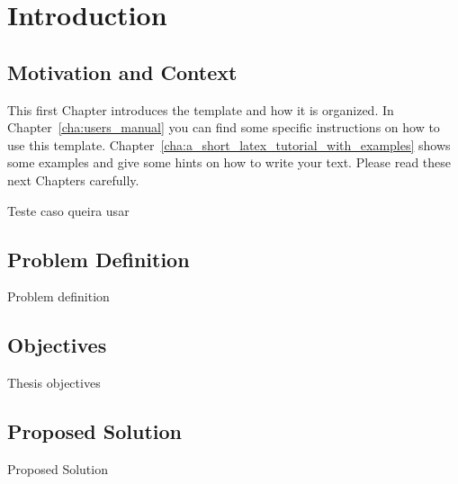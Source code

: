 
%

\chapter{Introduction}
\label{cha:introduction}




\section{Motivation and Context}
\label{sec:if_you_use_this_template}

This first Chapter introduces the template and how it is organized. In Chapter~\ref{cha:users_manual} you can find some specific instructions on how to use this template.  Chapter~\ref{cha:a_short_latex_tutorial_with_examples} shows some examples and give some hints on how to write your text. Please read these next Chapters carefully.

\begin{tcolorbox}[colback=green!8]
 Teste caso queira usar
\end{tcolorbox}

\section{Problem Definition}
\label{sub:prob_definition}
Problem definition


\section{Objectives}
\label{sub:objectives}
Thesis objectives

\section{Proposed Solution}
\label{sub:proposed_solution}
Proposed Solution